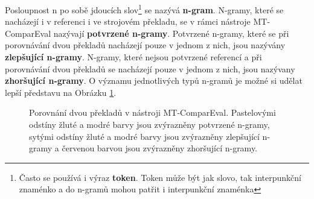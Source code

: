 Posloupnost n po sobě jdoucích slov\footnote{
  Často se používá i výraz \textbf{token}. Token může být jak slovo, tak interpunkční znaménko a do \mbox{n-gramů} mohou patřit i interpunkční znaménka}
  se nazývá \textbf{\mbox{n-gram}}.
N-gramy,
  které se nacházejí i v referenci i ve strojovém překladu,
  se v rámci nástroje MT-ComparEval nazývají \textbf{potvrzené \mbox{n-gramy}}.
Potvrzené \mbox{n-gramy},
  které se při porovnávání dvou překladů nacházejí pouze v jednom z nich,
  jsou nazývány \textbf{zlepšující \mbox{n-gramy}}.
N-gramy,
  které nejsou potvrzené referencí
  a při porovnávání dvou překladů se nacházejí pouze v jednom z nich,
  jsou nazývany \textbf{zhoršující \mbox{n-gramy}}.
O významu jednotlivých typů \mbox{n-gramů} je možné si udělat lepší představu na Obrázku \ref{img:n-grams}.

\begin{figure}

	\caption{
		Porovnání dvou překladů v nástroji MT-ComparEval.
		Pastelovými odstíny žluté a modré barvy jsou zvýrazněny potvrzené \mbox{n-gramy},
		sytými odstíny žluté a modré barvy jsou zvýrazněny zlepšující \mbox{n-gramy}
		a červenou barvou jsou zvýrazněny zhoršující \mbox{n-gramy}.
	}
	\label{img:n-grams}
\end{figure}

